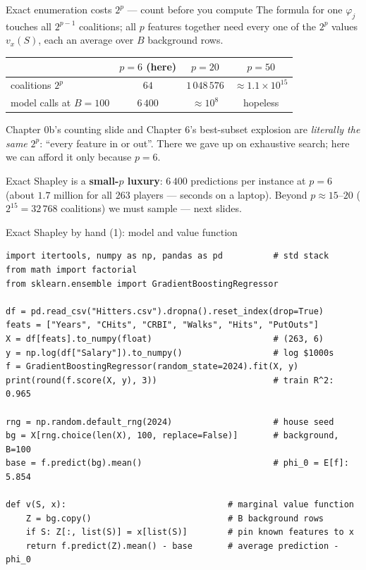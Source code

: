 \documentclass[aspectratio=169,11pt]{beamer}
\begin{document}
\begin{frame}{Exact enumeration costs $2^p$ --- count before you compute}
  The formula for one $\varphi_j$ touches all $2^{p-1}$ coalitions; all $p$
  features together need every one of the $2^p$ values $v_x(S)$, each an average
  over $B$ background rows.
  \begin{numexample}
    \begin{center}
    \begin{tabular}{@{}lccc@{}}
      \toprule
      & $p=6$ (here) & $p=20$ & $p=50$ \\
      \midrule
      coalitions $2^p$ & $64$ & $1\,048\,576$ & $\approx 1.1\times10^{15}$ \\
      model calls at $B=100$ & $6\,400$ & $\approx 10^{8}$ & hopeless \\
      \bottomrule
    \end{tabular}
    \end{center}
    Chapter 0b's counting slide and Chapter 6's best-subset explosion are
    \emph{literally the same} $2^p$: ``every feature in or out''. There we gave up
    on exhaustive search; here we can afford it only because $p=6$.
  \end{numexample}
  \begin{takeaway}
    Exact Shapley is a \textbf{small-$p$ luxury}: $6\,400$ predictions per instance at
    $p=6$ (about $1.7$ million for all $263$ players --- seconds on a laptop). Beyond
    $p\approx 15$--$20$ ($2^{15}=32\,768$ coalitions) we must sample --- next slides.
  \end{takeaway}
\end{frame}

\begin{frame}[fragile]{Exact Shapley by hand (1): model and value function}
  \begin{lstlisting}[basicstyle=\ttfamily\scriptsize]
import itertools, numpy as np, pandas as pd          # std stack
from math import factorial
from sklearn.ensemble import GradientBoostingRegressor

df = pd.read_csv("Hitters.csv").dropna().reset_index(drop=True)
feats = ["Years", "CHits", "CRBI", "Walks", "Hits", "PutOuts"]
X = df[feats].to_numpy(float)                        # (263, 6)
y = np.log(df["Salary"]).to_numpy()                  # log $1000s
f = GradientBoostingRegressor(random_state=2024).fit(X, y)
print(round(f.score(X, y), 3))                       # train R^2: 0.965

rng = np.random.default_rng(2024)                    # house seed
bg = X[rng.choice(len(X), 100, replace=False)]       # background, B=100
base = f.predict(bg).mean()                          # phi_0 = E[f]: 5.854

def v(S, x):                                # marginal value function
    Z = bg.copy()                           # B background rows
    if S: Z[:, list(S)] = x[list(S)]        # pin known features to x
    return f.predict(Z).mean() - base       # average prediction - phi_0
  \end{lstlisting}
\end{frame}
\end{document}
